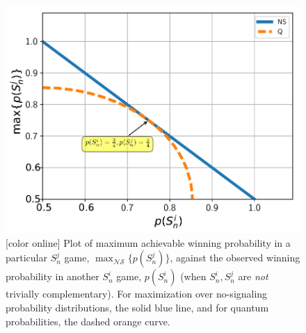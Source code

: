 \documentclass[%
 reprint,
 amsmath,amssymb,
 aps,
]{revtex4-1}
\theoremstyle{plain}
\begin{document}
\begin{figure}[hbtp] 
\includegraphics[scale=0.6]{images/Sn_vs_Sn.pdf}
\caption{ [color online] Plot of maximum achievable winning probability in a particular $S_n^j$ game, $\max_{\mathcal{NS}}\{p(S_n^j)\}$, against the observed winning probability in another $S_n^i$ game, $p(S_n^i)$  (when $S_n^i,S_n^j$ are \textit{not} trivially complementary). For maximization over no-signaling probability distributions, the solid blue line, and for quantum probabilities, the dashed orange curve.}
\label{snvssn} 
\end{figure}
\end{document}
